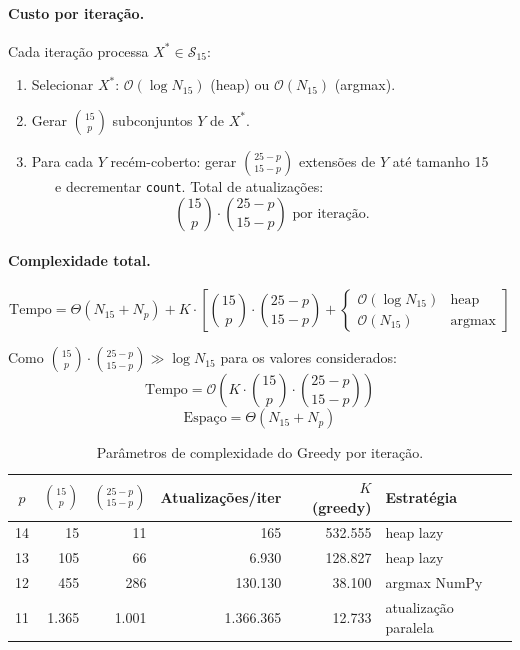 \documentclass[12pt,a4paper]{article}
\theoremstyle{definition}
\newcommand{\bigo}[1]{\mathcal{O}\!\left(#1\right)}
\newcommand{\bigtheta}[1]{\Theta\!\left(#1\right)}
\newcommand{\C}[2]{\binom{#1}{#2}}
\begin{document}
\paragraph{Custo por iteração.}
Cada iteração processa $X^* \in \mathcal{S}_{15}$:
\begin{enumerate}
  \item Selecionar $X^*$: $\bigo{\log N_{15}}$ (heap) ou $\bigo{N_{15}}$ (argmax).
  \item Gerar $\C{15}{p}$ subconjuntos $Y$ de $X^*$.
  \item Para cada $Y$ recém-coberto: gerar $\C{25-p}{15-p}$ extensões de $Y$ até tamanho 15
        e decrementar \texttt{count}. Total de atualizações:
        \[
          \C{15}{p} \cdot \C{25-p}{15-p} \text{ por iteração.}
        \]
\end{enumerate}

\paragraph{Complexidade total.}
\[
  \text{Tempo} = \bigtheta{N_{15} + N_p}
    + K \cdot \left[\C{15}{p}\cdot\C{25-p}{15-p}
    + \begin{cases} \bigo{\log N_{15}} & \text{heap} \\ \bigo{N_{15}} & \text{argmax} \end{cases}
    \right]
\]

Como $\C{15}{p}\cdot\C{25-p}{15-p} \gg \log N_{15}$ para os valores considerados:
\[
  \boxed{\text{Tempo} = \bigo{K \cdot \C{15}{p} \cdot \C{25-p}{15-p}}}
\]
\[
  \text{Espaço} = \bigtheta{N_{15} + N_p}
\]

\begin{table}[H]
\centering
\caption{Parâmetros de complexidade do Greedy por iteração.}
\begin{tabular}{crrrrl}
\toprule
$p$ & $\C{15}{p}$ & $\C{25-p}{15-p}$ & Atualizações/iter & $K$ (greedy) & Estratégia \\
\midrule
14 & 15 & 11 & 165 & 532.555 & heap lazy \\
13 & 105 & 66 & 6.930 & 128.827 & heap lazy \\
12 & 455 & 286 & 130.130 & 38.100 & argmax NumPy \\
11 & 1.365 & 1.001 & 1.366.365 & 12.733 & atualização paralela \\
\bottomrule
\end{tabular}
\end{table}
\end{document}
